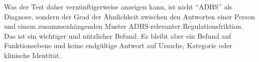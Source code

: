 \documentclass[11pt,a4paper]{article}
\begin{document}
Was der Test daher vernünftigerweise anzeigen kann, ist nicht ``ADHS'' als Diagnose, sondern der Grad der Ähnlichkeit zwischen den Antworten einer Person und einem zusammenhängenden Muster ADHS-relevanter Regulationsfriktion. Das ist ein wichtiger und nützlicher Befund. Es bleibt aber ein Befund auf Funktionsebene und keine endgültige Antwort auf Ursache, Kategorie oder klinische Identität.

\printbibliography
\end{document}
